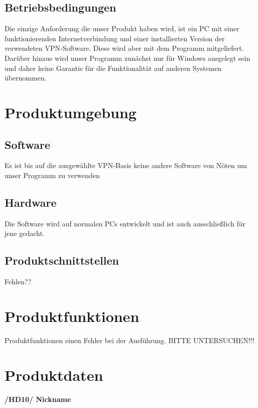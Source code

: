 \documentclass[a4paper,12pt]{scrreprt}
\begin{document}
	\section{Betriebsbedingungen}
	Die einzige Anforderung die unser Produkt haben wird, ist ein PC mit einer funktionierenden Internetverbindung und einer installierten Version der verwendeten VPN-Software. Diese wird aber mit dem Programm mitgeliefert. Darüber hinaus wird unser Programm zunächst nur für Windows ausgelegt sein und daher keine Garantie für die Funktionalität auf anderen Systemen übernommen.
		
\chapter{Produktumgebung}
	
	\section{Software}
		
		Es ist bis auf die ausgewählte VPN-Basis keine andere Software von Nöten um unser Programm zu verwenden
		
	\section{Hardware}
		
	Die Software wird auf normalen PCs entwickelt und ist auch ausschließlich für jene gedacht. 
		
		
	\section{Produktschnittstellen}
		
	Fehlen??
		
\chapter{Produktfunktionen}
	Produktfunktionen einen Fehler bei der Ausführung. BITTE UNTERSUCHEN!!!
	
\chapter{Produktdaten}
	
	\textbf{/HD10/ Nickname}	
	
\end{document}
